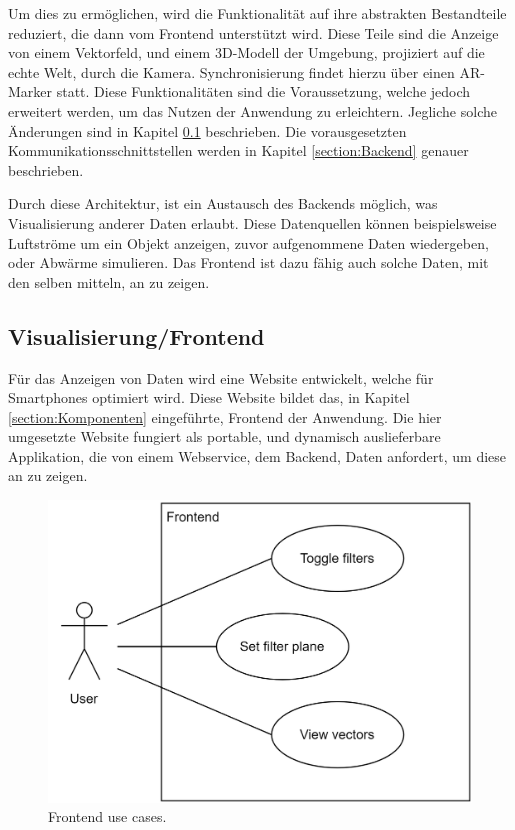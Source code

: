 Um dies zu ermöglichen, wird die Funktionalität auf ihre abstrakten
Bestandteile reduziert, die dann vom Frontend unterstützt wird.
Diese Teile sind die Anzeige von einem Vektorfeld, und einem
3D-Modell der Umgebung, projiziert auf die echte Welt, durch die
Kamera. Synchronisierung findet hierzu über einen AR-Marker statt.
Diese Funktionalitäten sind die Voraussetzung, welche jedoch
erweitert werden, um das Nutzen der Anwendung zu erleichtern.
Jegliche solche Änderungen sind in Kapitel \ref{section:Frontend}
beschrieben. Die vorausgesetzten Kommunikationsschnittstellen werden
in Kapitel \ref{section:Backend} genauer beschrieben.

Durch diese Architektur, ist ein Austausch des Backends möglich,
was Visualisierung anderer Daten erlaubt. Diese Datenquellen können
beispielsweise Luftströme um ein Objekt anzeigen, zuvor aufgenommene
Daten wiedergeben, oder Abwärme simulieren. Das Frontend ist dazu
fähig auch solche Daten, mit den selben mitteln, an zu zeigen.



\subsection{Visualisierung/Frontend}
\label{section:Frontend}
\FloatBarrier

Für das Anzeigen von Daten wird eine Website entwickelt, welche
für Smartphones optimiert wird. Diese Website bildet das, in Kapitel
\ref{section:Komponenten} eingeführte, Frontend der Anwendung.
Die hier umgesetzte Website fungiert als portable, und dynamisch
auslieferbare Applikation, die von einem Webservice, dem Backend,
Daten anfordert, um diese an zu zeigen.

\begin{figure}
	\centering
	\includegraphics[width=.6\linewidth]{images/frontend/UseCases}
	\caption{Frontend use cases.}
	\label{fig:frontendUseCase}
\end{figure}


